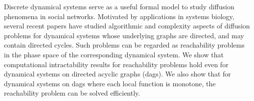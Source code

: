 Discrete dynamical systems serve as a
useful formal model to study diffusion phenomena in social networks.
Motivated by applications in systems biology,
several recent papers have studied algorithmic and complexity aspects of
diffusion problems for dynamical systems whose underlying graphs
are directed, and may contain directed cycles.  
Such problems can be regarded as
reachability problems in the phase space of the corresponding
dynamical system. We show that computational intractability
results for reachability problems hold even for dynamical systems
on directed acyclic graphs (dags). 
We also show that for dynamical systems on dags
where each local function is monotone, 
the reachability problem can be solved efficiently. 
